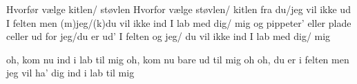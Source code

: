 \documentclass[a4paper,11pt]{article}
\begin{document}
\begin{song}
	 Hvorfør vælge kitlen/ støvlen
	Hvorfor vælge  støvlen/ kitlen fra
 	du/jeg vil ikke ud I felten men (m)jeg/(k)du
	vil ikke ind I lab med  dig/ mig
        og pippeter’
       	eller plade celler ud for jeg/du er
        ud’ I felten og  jeg/ du
	vil ikke ind I lab med  dig/ mig

	 oh, kom nu ind i lab til mig
	oh, kom nu bare ud til mig
	oh oh, du er i felten men jeg
	vil ha’ dig ind i lab til mig

\end{song}
\end{document}
